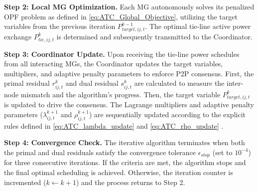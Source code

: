 \textbf{Step 2: Local MG Optimization.} Each MG autonomously solves its penalized OPF problem as defined in \eqref{eq:ATC_Global_Objective}, utilizing the target variables from the previous iteration $P_{target,ij,t}^{k-1}$. The optimal tie-line active power exchange $P_{tie,ij,t}^k$ is determined and subsequently transmitted to the Coordinator.

\textbf{Step 3: Coordinator Update.} Upon receiving the tie-line power schedules from all interacting MGs, the Coordinator updates the target variables, multipliers, and adaptive penalty parameters to enforce P2P consensus. 
First, the primal residual $r_{ij,t}^k$ and dual residual $s_{ij,t}^k$ are calculated to measure the inter-node mismatch and the algorithm's progress. Then, the target variable $P_{target,ij,t}^k$ is updated to drive the consensus. The Lagrange multipliers and adaptive penalty parameters ($\lambda_{ij,t}^{k+1}$ and $\rho_{ij,t}^{k+1}$) are sequentially updated according to the explicit rules defined in \eqref{eq:ATC_lambda_update} and \eqref{eq:ATC_rho_update} \cite{Mavromatis2021_AdaptiveRho}.

\textbf{Step 4: Convergence Check.} The iterative algorithm terminates when both the primal and dual residuals satisfy the convergence tolerance $\epsilon_{stop}$ (set to $10^{-4}$) for three consecutive iterations. If the criteria are met, the algorithm stops and the final optimal scheduling is achieved. Otherwise, the iteration counter is incremented ($k \leftarrow k+1$) and the process returns to Step 2.


